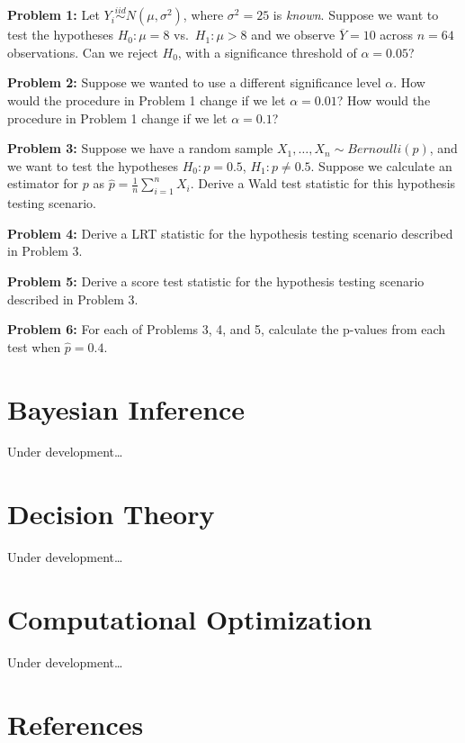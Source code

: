 \documentclass[
  letterpaper,
  DIV=11,
  numbers=noendperiod]{scrreprt}
\newlength{\cslhangindent}
\newlength{\cslentryspacingunit} %
\newenvironment{CSLReferences}[2] %
 {%
  \setlength{\parindent}{0pt}
  \ifodd #1
  \let\oldpar\par
  \def\par{\hangindent=\cslhangindent\oldpar}
  \fi
  \setlength{\parskip}{#2\cslentryspacingunit}
 }%
 {}
\begin{document}
\textbf{Problem 1:} Let \(Y_i \overset{iid}{\sim} N(\mu, \sigma^2)\),
where \(\sigma^2 = 25\) is \emph{known}. Suppose we want to test the
hypotheses \(H_0: \mu = 8\) vs.~\(H_1: \mu > 8\) and we observe
\(\overline{Y} = 10\) across \(n = 64\) observations. Can we reject
\(H_0\), with a significance threshold of \(\alpha = 0.05\)?

\textbf{Problem 2:} Suppose we wanted to use a different significance
level \(\alpha\). How would the procedure in Problem 1 change if we let
\(\alpha = 0.01\)? How would the procedure in Problem 1 change if we let
\(\alpha = 0.1\)?

\textbf{Problem 3:} Suppose we have a random sample
\(X_1, \dots, X_n \sim Bernoulli(p)\), and we want to test the
hypotheses \(H_0:p = 0.5\), \(H_1:p \neq 0.5\). Suppose we calculate an
estimator for \(p\) as \(\hat{p} = \frac{1}{n} \sum_{i = 1}^n X_i\).
Derive a Wald test statistic for this hypothesis testing scenario.

\textbf{Problem 4:} Derive a LRT statistic for the hypothesis testing
scenario described in Problem 3.

\textbf{Problem 5:} Derive a score test statistic for the hypothesis
testing scenario described in Problem 3.

\textbf{Problem 6:} For each of Problems 3, 4, and 5, calculate the
p-values from each test when \(\hat{p} = 0.4\).


\hypertarget{bayesian-inference}{%
\chapter{Bayesian Inference}\label{bayesian-inference}}

Under development\ldots{}


\hypertarget{decision-theory}{%
\chapter{Decision Theory}\label{decision-theory}}

Under development\ldots{}


\hypertarget{computational-optimization}{%
\chapter{Computational Optimization}\label{computational-optimization}}

Under development\ldots{}


\hypertarget{references}{%
\chapter*{References}\label{references}}


\hypertarget{refs}{}
\begin{CSLReferences}{0}{0}
\end{CSLReferences}
\end{document}
